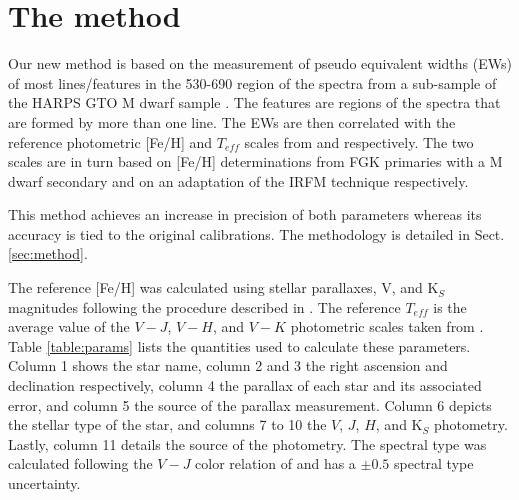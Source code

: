 \documentclass[referee]{aa}
\begin{document}
\section{The method}
\label{sec:calib}

Our new method is based on the measurement of pseudo equivalent widths (EWs) of most lines/features in the 530-690 region of the spectra from a sub-sample of the HARPS GTO M dwarf sample \citep{Bonfils-2013}. The features are regions of the spectra that are formed by more than one line. The EWs are then correlated with the reference photometric [Fe/H] and $T_{eff}$ scales from \citet{Neves-2012} and \citet{Casagrande-2008} respectively. The two scales are in turn based on [Fe/H] determinations from FGK primaries with a M dwarf secondary and on an adaptation of the IRFM technique \citep{Blackwell-1977} respectively.

This method achieves an increase in precision of both parameters whereas its accuracy is tied to the original calibrations. The methodology is detailed in Sect. \ref{sec:method}. 

The reference [Fe/H] was calculated using stellar parallaxes, V, and K$_{S}$ magnitudes following the procedure described in \citet{Neves-2012}. The reference $T_{eff}$ is the average value of the $V-J$, $V-H$, and $V-K$ photometric scales taken from \citet{Casagrande-2008}. Table \ref{table:params} lists the quantities used to calculate these parameters. Column 1 shows the star name, column 2 and 3 the right ascension and declination respectively, column 4 the parallax of each star and its associated error, and column 5 the source of the parallax measurement. Column 6 depicts the stellar type of the star, and columns 7 to 10 the $V$, $J$, $H$, and K$_{S}$ photometry. Lastly, column 11 details the source of the photometry. The spectral type was calculated following the $V-J$ color relation of \citet{Lepine-2013} and has a $\pm 0.5$ spectral type uncertainty.

\end{document}
